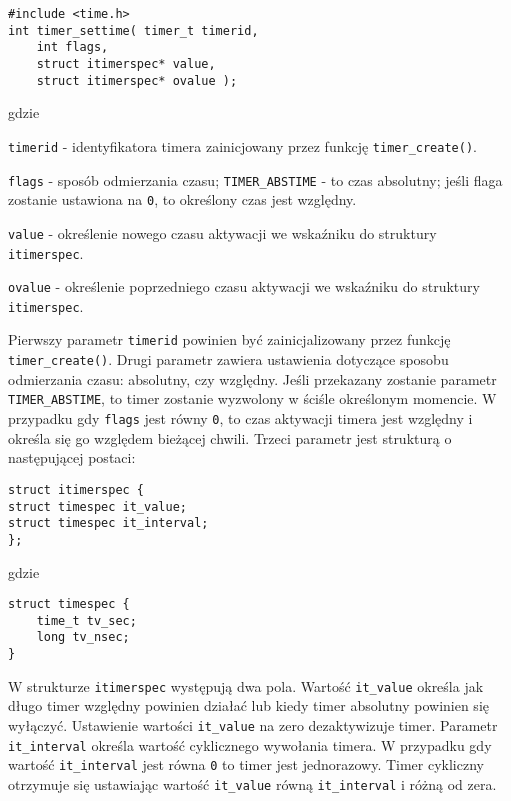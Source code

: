 \begin{lstlisting}[style=MyCStyle]
#include <time.h>
int timer_settime( timer_t timerid,
	int flags,
	struct itimerspec* value,
	struct itimerspec* ovalue );
\end{lstlisting}

\noindent
gdzie

\begin{myitemize}
\item[] \lstinline[style=MyCStyle]{timerid} - identyfikatora timera zainicjowany przez funkcję \lstinline[style=MyCStyle]{timer_create()}.
\item[] \lstinline[style=MyCStyle]{flags} - sposób odmierzania czasu; \lstinline[style=MyCStyle]{TIMER_ABSTIME} - to czas absolutny; jeśli flaga zostanie ustawiona na \lstinline[style=MyCStyle]{0}, to określony czas jest względny.
\item[] \lstinline[style=MyCStyle]{value} - określenie nowego czasu aktywacji we wskaźniku do struktury \lstinline[style=MyCStyle]{itimerspec}.
\item[] \lstinline[style=MyCStyle]{ovalue} - określenie poprzedniego czasu aktywacji we wskaźniku do struktury \lstinline[style=MyCStyle]{itimerspec}.
\end{myitemize}

Pierwszy parametr \lstinline[style=MyCStyle]{timerid} powinien być zainicjalizowany przez funkcję \lstinline[style=MyCStyle]{timer_create()}. Drugi parametr zawiera ustawienia dotyczące sposobu odmierzania czasu: absolutny, czy względny. Jeśli przekazany zostanie parametr \lstinline[style=MyCStyle]{TIMER_ABSTIME}, to timer zostanie wyzwolony w ściśle określonym momencie. W przypadku gdy \lstinline[style=MyCStyle]{flags} jest równy \lstinline[style=MyCStyle]{0}, to czas aktywacji timera jest względny i określa się go względem bieżącej chwili. Trzeci parametr jest strukturą o następującej postaci:

\begin{lstlisting}[style=MyCStyle]
struct itimerspec {
struct timespec it_value;
struct timespec it_interval;
};
\end{lstlisting}

\noindent
gdzie

\begin{lstlisting}[style=MyCStyle]
struct timespec {
	time_t tv_sec;
	long tv_nsec;
}
\end{lstlisting}

W strukturze \lstinline[style=MyCStyle]{itimerspec} występują dwa pola. Wartość \lstinline[style=MyCStyle]{it_value} określa jak długo timer względny powinien działać lub kiedy timer absolutny powinien się wyłączyć. Ustawienie wartości \lstinline[style=MyCStyle]{it_value} na zero dezaktywizuje timer. Parametr \lstinline[style=MyCStyle]{it_interval} określa wartość cyklicznego wywołania timera. W przypadku gdy wartość \lstinline[style=MyCStyle]{it_interval} jest równa \lstinline[style=MyCStyle]{0} to timer jest jednorazowy. Timer cykliczny otrzymuje się ustawiając wartość \lstinline[style=MyCStyle]{it_value} równą \lstinline[style=MyCStyle]{it_interval} i różną od zera.

